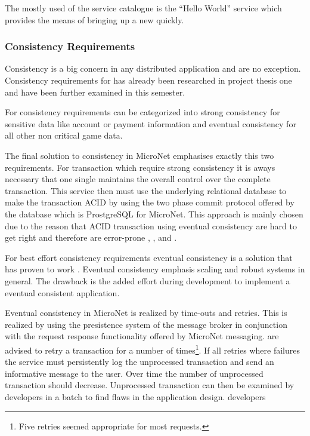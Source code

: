 The mostly used \ms{} of the service catalogue is the ``Hello World''
service which provides the means of bringing up a new \ms{} quickly.

\subsubsection{Consistency Requirements}

Consistency is a big concern in any distributed application and \ogs{} are no
exception. Consistency requirements for \ogs{} has already been researched in
project thesis one  and have been further
examined in this semester.

For \ogs{} consistency requirements can be categorized into strong consistency
for sensitive data like account or payment information and eventual consistency
for all other non critical game data. 

The final solution to consistency in MicroNet emphasises exactly this two
requirements. For transaction which require strong consistency it is aways
necessary that one single \ms{} maintains the overall control over the complete
transaction. This service then must use the underlying relational database to
make the transaction ACID by using the two phase commit protocol offered by the
database which is ProstgreSQL for MicroNet. This approach is mainly chosen due
to the reason that ACID transaction using eventual consistency are hard to get
right and therefore are error-prone \cite{zhang2011transaction},
\cite{zhang2008persistence}, and \cite{pardon2014atomic}.

For best effort consistency requirements eventual consistency is a solution that
has proven to work \cite{graham2016distributed_transactions}. Eventual
consistency emphasis scaling and robust systems in general. The drawback is the
added effort during development to implement a eventual consistent application.

Eventual consistency in MicroNet is realized by time-outs and retries. This is
realized by using the presistence system of the message broker in conjunction
with the request response functionality offered by MicroNet messaging. \mss{}
are advised to retry a transaction for a number of times\footnote{Five retries
seemed appropriate for most requests.}. If all retries where failures the
service must persistently log the unprocessed transaction and send an
informative message to the user. Over time the number of unprocessed transaction
should decrease. Unprocessed transaction can then be examined by developers in a
batch to find flaws in the application design.
developers
